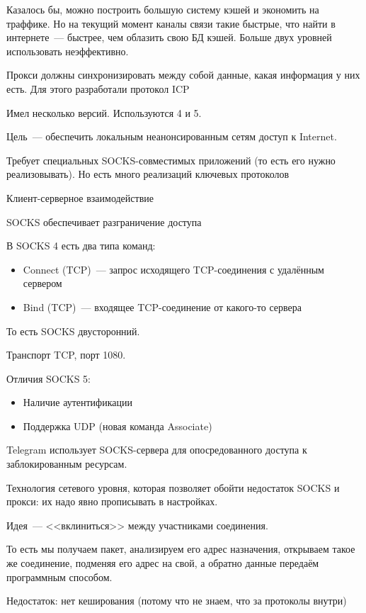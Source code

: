 Казалось бы, можно построить большую систему кэшей и экономить на траффике. Но на текущий момент каналы связи такие быстрые, что найти в интернете~--- быстрее, чем облазить свою БД кэшей. Больше двух уровней использовать неэффективно.

Прокси должны синхронизировать между собой данные, какая информация у них есть. Для этого разработали протокол ICP


Имел несколько версий. Используются 4 и 5.

Цель~--- обеспечить локальным неанонсированным сетям доступ к Internet.

Требует специальных SOCKS-совместимых приложений (то есть его нужно реализовывать). Но есть много реализаций ключевых протоколов

Клиент-серверное взаимодействие

SOCKS обеспечивает разграничение доступа

В SOCKS 4 есть два типа команд:
\begin{itemize}
    \item Connect (TCP)~--- запрос исходящего TCP-соединения с удалённым сервером
    \item Bind (TCP)~--- входящее TCP-соединение от какого-то сервера
\end{itemize}

То есть SOCKS двусторонний.

Транспорт TCP, порт 1080.

Отличия SOCKS 5:
\begin{itemize}
    \item Наличие аутентификации
    \item Поддержка UDP (новая команда Associate)
\end{itemize}

Telegram использует SOCKS-сервера для опосредованного доступа к заблокированным ресурсам.


Технология сетевого уровня, которая позволяет обойти недостаток SOCKS и прокси: их надо явно прописывать в настройках.

Идея~--- <<вклиниться>> между участниками соединения.

То есть мы получаем пакет, анализируем его адрес назначения, открываем такое же соединение, подменяя его адрес на свой, а обратно данные передаём программным способом.

Недостаток: нет кеширования (потому что не знаем, что за протоколы внутри)

